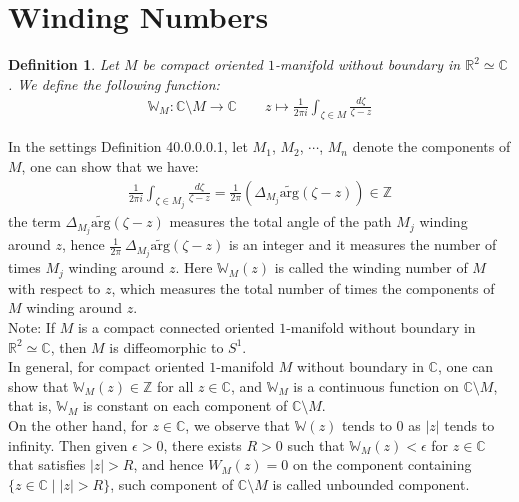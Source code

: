 \documentclass[15pt]{book}
\theoremstyle{break}
\theoremstyle{break}
\newtheorem{defn}{Definition}[corL]
\newcommand{\R}{\mathbb{R}}
\newcommand{\Z}{\mathbb{Z}}
\newcommand{\Complex}{\mathbb{C}}
\newcommand{\that}[1]{\widetilde{#1}}
\newcommand{\note}{\color{red}Note: \color{black}}
\begin{document}
\newpage
\section[Winding Numbers]{\color{red}Winding Numbers\color{black}}
\begin{defn}
Let $M$ be compact oriented $1$-manifold without boundary in $\R^2\simeq \Complex$. We define the following function:
\begin{align*}
\mathbb{W}_M: \Complex\setminus M \to \Complex  \qquad z\mapsto \frac{1}{2\pi i}\int_{\zeta \in M} \frac{d\zeta}{\zeta -z}
\end{align*}
\end{defn}

In the settings Definition 40.0.0.0.1, let $M_1$, $M_2$, $\cdots$, $M_n$ denote the components of $M$, one can show that we have:
\begin{align*}
\frac{1}{2\pi i}\int_{\zeta \in M_j}\frac{d\zeta}{\zeta- z} = \frac{1}{2\pi} \left( \Delta_{M_j} \that{\text{arg}}(\zeta - z)\right)  \in \Z
\end{align*}
the term $ \Delta_{M_j} \that{\text{arg}}(\zeta - z)$ measures the total angle of the path $M_j$ winding around $z$, hence $\frac{1}{2\pi} \ \Delta_{M_j} \that{\text{arg}}(\zeta - z)$ is an integer and it measures the number of times $M_j$ winding around $z$. Here $\mathbb{W}_M(z)$ is called the winding number of $M$ with respect to $z$, which measures the total number of times the components of $M$ winding around $z$.\\


\note If $M$ is a compact connected oriented $1$-manifold without boundary in $\R^2\simeq \Complex$, then $M$ is diffeomorphic to $S^1$.\\

In general, for compact oriented $1$-manifold $M$ without boundary in $\Complex$, one can show that $\mathbb{W}_M(z) \in \Z$ for all $z \in \Complex$, and $\mathbb{W}_M$ is a continuous function on $\Complex \setminus M$, that is, $\mathbb{W}_M$ is constant on each component of $\Complex \setminus M$. \\

On the other hand, for $z \in \Complex$, we observe that $\mathbb{W}(z)$ tends to $0$ as $|z|$ tends to infinity. Then given $\epsilon>0$, there exists $R>0$ such that $\mathbb{W}_M(z) < \epsilon$ for $z \in \Complex$ that satisfies $|z|>R$, and hence $W_M(z) = 0$ on the component containing $\{z \in \Complex \mid |z| >R\}$, such component of $\Complex \setminus M$ is called unbounded component.\\
\end{document}
